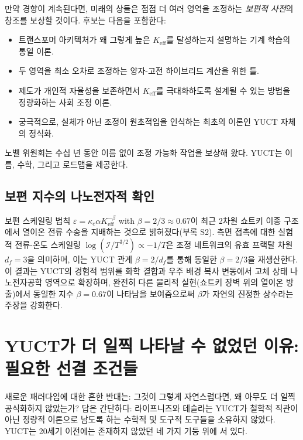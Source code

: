 \documentclass[12pt,a4paper]{article}
\begin{document}
	만약 경향이 계속된다면, 미래의 상들은 점점 더 여러 영역을 조정하는 \emph{보편적 사전}의 창조를 보상할 것이다. 후보는 다음을 포함한다:
	\begin{itemize}
		\item 트랜스포머 아키텍처가 왜 그렇게 높은 \(K_{\mathrm{eff}}\)를 달성하는지 설명하는 기계 학습의 통일 이론.
		\item 두 영역을 최소 오차로 조정하는 양자-고전 하이브리드 계산을 위한 틀.
		\item 제도가 개인적 자율성을 보존하면서 \(K_{\mathrm{eff}}\)를 극대화하도록 설계될 수 있는 방법을 정량화하는 사회 조정 이론.
		\item 궁극적으로, 실체가 아닌 조정이 원초적임을 인식하는 최초의 이론인 YUCT 자체의 정식화.
	\end{itemize}
	노벨 위원회는 수십 년 동안 이름 없이 조정 가능화 작업을 보상해 왔다. YUCT는 이름, 수학, 그리고 로드맵을 제공한다.
	
	\subsection{보편 지수의 나노전자적 확인}
	
	보편 스케일링 법칙 \(\varepsilon = \kappa_c \alpha K_{\mathrm{eff}}^{-\beta}\) with \(\beta = 2/3 \approx 0.67\)이 최근 2차원 쇼트키 이종 구조에서 열이온 전류 수송을 지배하는 것으로 밝혀졌다(부록 S2). 측면 접촉에 대한 실험적 전류-온도 스케일링 \(\log(\mathcal{I}/T^{3/2}) \propto -1/T\)은 조정 네트워크의 유효 프랙탈 차원 \(d_f = 3\)을 의미하며, 이는 YUCT 관계 \(\beta = 2/d_f\)를 통해 동일한 \(\beta = 2/3\)을 재생산한다. 이 결과는 YUCT의 경험적 범위를 화학 결합과 우주 배경 복사 변동에서 고체 상태 나노전자공학 영역으로 확장하며, 완전히 다른 물리적 실현(쇼트키 장벽 위의 열이온 방출)에서 동일한 지수 \(\beta = 0.67\)이 나타남을 보여줌으로써 \(\beta\)가 자연의 진정한 상수라는 주장을 강화한다.
	
	\section{YUCT가 더 일찍 나타날 수 없었던 이유: 필요한 선결 조건들}
	\label{sec:prerequisites}
	
	새로운 패러다임에 대한 흔한 반대는: 그것이 그렇게 자연스럽다면, 왜 아무도 더 일찍 공식화하지 않았는가? 답은 간단하다: 라이프니츠와 테슬라는 YUCT가 철학적 직관이 아닌 정량적 이론으로 남도록 하는 수학적 및 도구적 도구들을 소유하지 않았다. YUCT는 20세기 이전에는 존재하지 않았던 네 가지 기둥 위에 서 있다.
	
\end{document}
